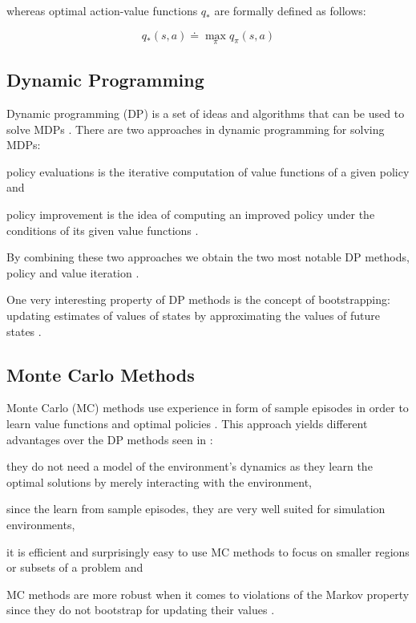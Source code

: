 \documentclass{seal_thesis}
\begin{document}
whereas optimal action-value functions $q_*$ are formally defined as follows:

\begin{equation}
	q_* (s,a) \doteq \max_\pi q_\pi (s,a)
\end{equation}

\subsection{Dynamic Programming}
\label{subsec:dp}

Dynamic programming (DP) is a set of ideas and algorithms that can be used to solve MDPs \cite[p. 95]{Sutton1998}. There are two approaches in dynamic programming for solving MDPs:
\begin{enumerate*}
	\item policy evaluations is the iterative computation of value functions of a given policy and
	\item policy improvement is the idea of computing an improved policy under the conditions of its given value functions \cite[p. 95]{Sutton1998}.
\end{enumerate*}

By combining these two approaches we obtain the two most notable DP methods, \ie policy and value iteration \cite[p. 95]{Sutton1998}.

One very interesting property of DP methods is the concept of bootstrapping: updating estimates of values of states by approximating the values of future states \cite[p. 96]{Sutton1998}.

\subsection{Monte Carlo Methods}
\label{subsec:mc}

Monte Carlo (MC) methods use experience in form of sample episodes in order to learn value functions and optimal policies \cite[p. 123]{Sutton1998}. This approach yields different advantages over the DP methods seen in :
\begin{enumerate*}
	\item they do not need a model of the environment's dynamics as they learn the optimal solutions by merely interacting with the environment,
	\item since the learn from sample episodes, they are very well suited for simulation environments,
	\item it is efficient and surprisingly easy to use MC methods to focus on smaller regions or subsets of a problem and
	\item MC methods are more robust when it comes to violations of the Markov property since they do not bootstrap for updating their values \cite[p. 123]{Sutton1998}.
\end{enumerate*}
\end{document}
